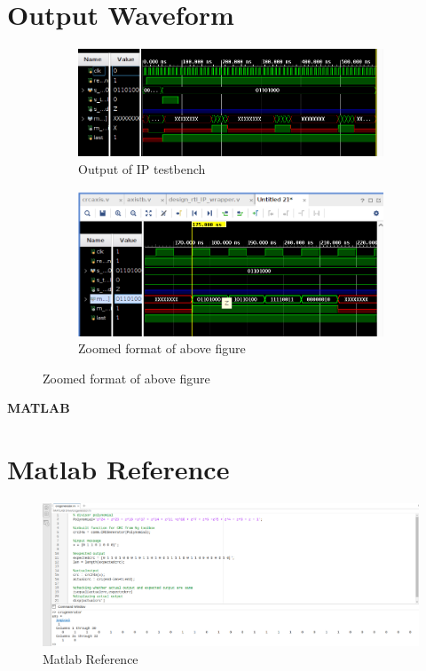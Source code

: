 \documentclass{article}
\begin{document}
\vspace{15cm}


\section{Output Waveform}
\vspace{1cm}
\begin{figure}[h]
\centering
\begin{subfigure}[b]{1.1\textwidth}
    \centering
\includegraphics[width=\textwidth]{figs/p2ipwavfull.png}
    \caption{Output of IP testbench}
    \label{fig:my_label}
\end{subfigure}
\hfill
\begin{subfigure}[b]{1.1\textwidth}
    \centering
\includegraphics[width=\textwidth]{figs/p2ipwav.png}
    \caption{Zoomed format of above figure}
    \label{fig:my_label}
\end{subfigure}
\end{figure}
\vspace{15cm}

\maketitle
\hfill \textbf{MATLAB}
\section{Matlab Reference}
\begin{figure}[h]
\centering
\includegraphics[width=1.3\textwidth]{figs/actual_matlab.png}
    \caption{Matlab Reference}
    \label{fig:my_label}
\end{figure}
\vspace{3cm}
\end{document}
